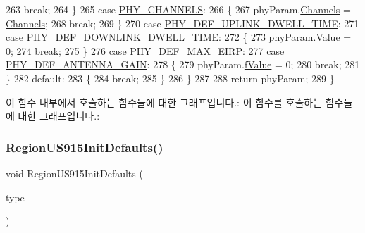 \begin{DoxyCode}
263             \textcolor{keywordflow}{break};
264         \}
265         \textcolor{keywordflow}{case} \mbox{\hyperlink{group___r_e_g_i_o_n_gga51cbe8f5433d914fe9cf81b451de2c2da52c9055b2e5bbfc05c86e83798856aba}{PHY\_CHANNELS}}:
266         \{
267             phyParam.\mbox{\hyperlink{unionu_phy_param_afecbd1e457cbd79eb7072bd140ff33d4}{Channels}} = \mbox{\hyperlink{_region_u_s915_8c_a83f8d040b2c69b3b4ed9ff970b0efcfb}{Channels}};
268             \textcolor{keywordflow}{break};
269         \}
270         \textcolor{keywordflow}{case} \mbox{\hyperlink{group___r_e_g_i_o_n_gga51cbe8f5433d914fe9cf81b451de2c2dab35cca5e0dae3d87e02c8c80e4d4685e}{PHY\_DEF\_UPLINK\_DWELL\_TIME}}:
271         \textcolor{keywordflow}{case} \mbox{\hyperlink{group___r_e_g_i_o_n_gga51cbe8f5433d914fe9cf81b451de2c2da8e29179691bf6520256a7af0cabae6ad}{PHY\_DEF\_DOWNLINK\_DWELL\_TIME}}:
272         \{
273             phyParam.\mbox{\hyperlink{unionu_phy_param_a8e0dcce3428a8051614e852b8836d0d1}{Value}} = 0;
274             \textcolor{keywordflow}{break};
275         \}
276         \textcolor{keywordflow}{case} \mbox{\hyperlink{group___r_e_g_i_o_n_gga51cbe8f5433d914fe9cf81b451de2c2da5bdce0ffd449781819a0d87732ebd2b7}{PHY\_DEF\_MAX\_EIRP}}:
277         \textcolor{keywordflow}{case} \mbox{\hyperlink{group___r_e_g_i_o_n_gga51cbe8f5433d914fe9cf81b451de2c2da37b73a543ea79ce58bf18035329ba773}{PHY\_DEF\_ANTENNA\_GAIN}}:
278         \{
279             phyParam.\mbox{\hyperlink{unionu_phy_param_ad30735f839c3c7592fc5bc5390c45715}{fValue}} = 0;
280             \textcolor{keywordflow}{break};
281         \}
282         \textcolor{keywordflow}{default}:
283         \{
284             \textcolor{keywordflow}{break};
285         \}
286     \}
287 
288     \textcolor{keywordflow}{return} phyParam;
289 \}
\end{DoxyCode}
이 함수 내부에서 호출하는 함수들에 대한 그래프입니다.\+:
이 함수를 호출하는 함수들에 대한 그래프입니다.\+:
\mbox{\label{group___r_e_g_i_o_n_u_s915_ga099942705729797728a84270350aac78}} 
\subsubsection{\texorpdfstring{Region\+U\+S915\+Init\+Defaults()}{RegionUS915InitDefaults()}}
{\footnotesize\ttfamily void Region\+U\+S915\+Init\+Defaults (\begin{DoxyParamCaption}\item[{\mbox{\hyperlink{group___r_e_g_i_o_n_gaddc73ae10673ec925724e7870363bda9}{Init\+Type\+\_\+t}}}]{type }\end{DoxyParamCaption})}



